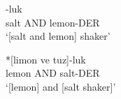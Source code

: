 \begin{exe}
    \ex \label{kornfiltder}
    \begin{xlist}
        \ex {}-luk \\ salt AND lemon-DER \\ 
        \glt `[salt and lemon] shaker'
        
        \ex \gll 
        *[limon ve tuz]-luk \\ lemon AND salt-DER \\
        \glt `[lemon] and [salt shaker]'
    \end{xlist}
\end{exe}
